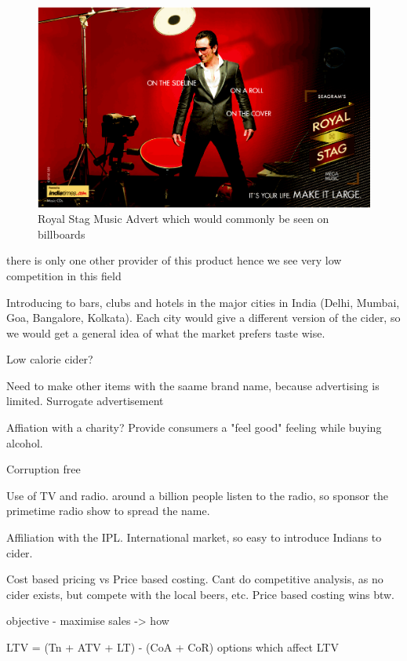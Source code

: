 \documentclass{article}
\begin{document}
\begin{figure}[h!]
	\caption{Royal Stag Music Advert which would commonly be seen on billboards}
	\centering
		\includegraphics[width=\textwidth]{royalstagad1.png}
\end{figure}


there is only one other provider of this product hence we see very low competition in this field 

Introducing to bars, clubs and hotels in the major cities in India (Delhi, Mumbai, Goa,
Bangalore, Kolkata). Each city would give a different version of the cider, so we would
get a general idea of what the market prefers taste wise.

Low calorie cider?

Need to make other items with the saame brand name, because advertising is limited. Surrogate advertisement

Affiation with a charity? Provide consumers a "feel good" feeling while buying alcohol.

Corruption free

Use of TV and radio. around a billion people listen to the radio, so sponsor the primetime radio
show to spread the name.

Affiliation with the IPL. International market, so easy to introduce Indians to cider.

Cost based pricing vs Price based costing. Cant do competitive analysis, as no cider exists, but compete with
the local beers, etc. Price based costing wins btw.



objective - maximise sales -> how

LTV = (Tn + ATV + LT) - (CoA + CoR) 
options which affect LTV
\end{document}

